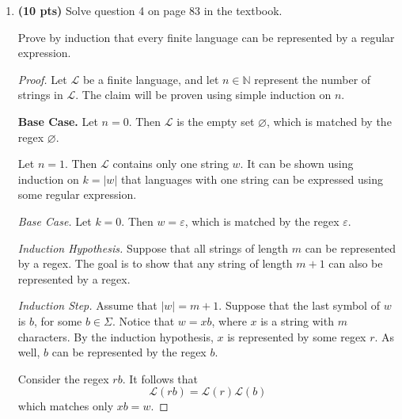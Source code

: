 \documentclass[11pt]{article}
\begin{document}
\begin{enumerate}[label=\textbf{Q\arabic*.}]
\begin{enumerate}[label=\textit{\alph*)}]
\begin{proof}
	If the transition \(q_0 \xrightarrow{1}q_0\) is always taken, \(w\) can never be accepted. On the other hand, if the transition \(q_0 \xrightarrow{1}q_1\) is taken for some \(w(i_j)\), then \(w\) is rejected by the induction hypothesis.

	By the principle of complete induction, it can be concluded that there is no path where \(\mathcal{N}\) accepts \(w \notin L\).

	Therefore, the NFA \(\mathcal{N}\) correctly accepts \(L\), completing the proof.
	\medbreak
\end{proof}

\item \textbf{(3 pts)} \textit{Bonus}: The smallest DFA that accepts $L$ has to have at most $2^{k+1}-1$ number of states.
lol
\end{enumerate}

\item \textbf{(10 pts)} Solve question 4 on page 83 in the textbook.

Prove by induction that every finite language can be represented by a regular expression.
\begin{proof}
	Let \(\mathcal{L}\) be a finite language, and let \(n \in \mathbb{N}\) represent the number of strings in \(\mathcal{L}\). The claim will be proven using simple induction on \(n\).

	\textbf{Base Case.} Let \(n = 0\). Then \(\mathcal{L}\) is the empty set \(\varnothing\), which is matched by the regex \(\varnothing\).

	Let \(n=1\). Then \(\mathcal{L}\) contains only one string \(w\). It can be shown using induction on \(k=|w|\) that languages with one string can be expressed using some regular expression.

	\textit{Base Case.} Let \(k=0\). Then \(w = \varepsilon\), which is matched by the regex \(\varepsilon\).

	\textit{Induction Hypothesis.} Suppose that all strings of length \(m\) can be represented by a regex. The goal is to show that any string of length \(m+1\) can also be represented by a regex.

	\textit{Induction Step.} Assume that \(|w| = m+1\). Suppose that the last symbol of \(w\) is \(b\), for some \(b \in \Sigma\). Notice that \(w = xb\), where \(x\) is a string with \(m\) characters. By the induction hypothesis, \(x\) is represented by some regex \(r\). As well, \(b\) can be represented by the regex \(b\).

	Consider the regex \(rb\). It follows that
	\[
		\mathcal{L} (rb) = \mathcal{L} (r) \mathcal{L} (b)
	\]
	which matches only \(xb = w\).


\end{proof}
\end{enumerate}
\end{document}
